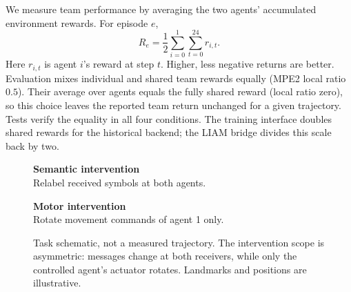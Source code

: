 \documentclass[10pt,a4paper]{article}
\begin{document}
We measure team performance by averaging the two agents' accumulated environment rewards. For episode $e$,
\begin{equation}
 R_e=\frac{1}{2}\sum_{i=0}^{1}\sum_{t=0}^{24}r_{i,t}.
\end{equation}
Here $r_{i,t}$ is agent $i$'s reward at step $t$. Higher, less negative returns are better. Evaluation mixes individual and shared team rewards equally (MPE2 local ratio $0.5$). Their average over agents equals the fully shared reward (local ratio zero), so this choice leaves the reported team return unchanged for a given trajectory. Tests verify the equality in all four conditions. The training interface doubles shared rewards for the historical backend; the LIAM bridge divides this scale back by two.

\begin{figure}[ht]
\centering
\begin{minipage}[c]{0.57\linewidth}
\centering
{}
\end{minipage}\hfill
\begin{minipage}[c]{0.38\linewidth}
\raggedright\small
\textbf{Semantic intervention}\\[3pt]
Relabel received symbols at both agents.
\par\vspace{12pt}
\textbf{Motor intervention}\\[3pt]
Rotate movement commands of agent 1 only.
\end{minipage}
\caption{Task schematic, not a measured trajectory. The intervention scope is asymmetric: messages change at both receivers, while only the controlled agent's actuator rotates. Landmarks and positions are illustrative.}
\label{fig:task}
\end{figure}
\end{document}
